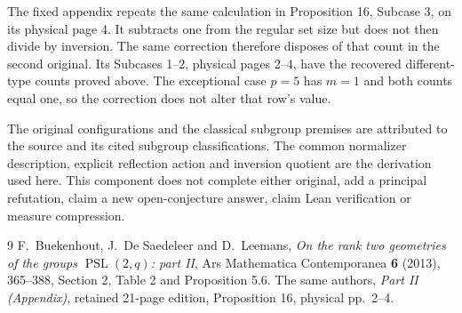 \documentclass[11pt]{article}
\newcommand{\PSL}{\operatorname{PSL}}
\begin{document}
The fixed appendix repeats the same calculation in Proposition 16,
Subcase 3, on its physical page 4. It subtracts one from the regular
set size but does not then divide by inversion. The same correction
therefore disposes of that count in the second original. Its
Subcases 1--2, physical pages 2--4, have the recovered different-type
counts proved above. The exceptional case $p=5$ has $m=1$ and both
counts equal one, so the correction does not alter that row's value.

The original configurations and the classical subgroup premises are
attributed to the source and its cited subgroup classifications.
The common normalizer description, explicit reflection action and
inversion quotient are the derivation used here. This component does
not complete either original, add a principal refutation, claim a new
open-conjecture answer, claim Lean verification or measure compression.

\begin{thebibliography}{9}
 F.~Buekenhout, J.~De Saedeleer and D.~Leemans,
\emph{On the rank two geometries of the groups $\PSL(2,q)$: part II},
Ars Mathematica Contemporanea \textbf{6} (2013), 365--388,
Section 2, Table 2 and Proposition 5.6.
 The same authors, \emph{Part II (Appendix)},
retained 21-page edition, Proposition 16, physical pp.~2--4.
\end{thebibliography}
\end{document}
